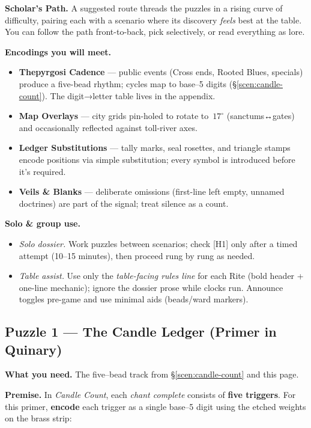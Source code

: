 \documentclass[11pt]{article}
\numberwithin{equation}{section} %
\theoremstyle{plain} %
\theoremstyle{definition} %
\theoremstyle{remark} %
\begin{document}
\medskip
\noindent\textbf{Scholar’s Path.} A suggested route threads the puzzles in a rising curve of difficulty, pairing each with a scenario where its discovery \emph{feels} best at the table. You can follow the path front-to-back, pick selectively, or read everything as lore.

\medskip
\noindent\textbf{Encodings you will meet.}
\begin{itemize}\setlength\itemsep{0.3em}
  \item \textbf{Thepyrgosi Cadence} — public events (Cross ends, Rooted Blues, specials) produce a five-bead rhythm; cycles map to base–5 digits (\S\ref{scen:candle-count}). The digit→letter table lives in the appendix.
  \item \textbf{Map Overlays} — city grids pin-holed to rotate to \(\,17^\circ\) (sanctums↔gates) and occasionally reflected against toll-river axes.
  \item \textbf{Ledger Substitutions} — tally marks, seal rosettes, and triangle stamps encode positions via simple substitution; every symbol is introduced before it’s required.
  \item \textbf{Veils \& Blanks} — deliberate omissions (first-line left empty, unnamed doctrines) are part of the signal; treat silence as a count.
\end{itemize}

\medskip
\noindent\textbf{Solo \& group use.}
\begin{itemize}\setlength{\itemsep}{0.3em}
  \item \emph{Solo dossier.} Work puzzles between scenarios; check \textsc{[H1]} only after a timed attempt (10–15 minutes), then proceed rung by rung as needed.
  \item \emph{Table assist.} Use only the \emph{table-facing rules line} for each Rite (bold header + one-line mechanic); ignore the dossier prose while clocks run. Announce toggles pre-game and use minimal aids (beads/ward markers).
\end{itemize}
 
\subsection{Puzzle 1 — The Candle Ledger (Primer in Quinary)}
\label{pz:candle-ledger}

\noindent\textbf{What you need.} The five–bead track from \S\ref{scen:candle-count} and this page.

\medskip
\noindent\textbf{Premise.} In \emph{Candle Count}, each \emph{chant complete} consists of \textbf{five triggers}. For this primer, \textbf{encode} each trigger as a single base–5 digit using the etched weights on the brass strip:
\end{document}
